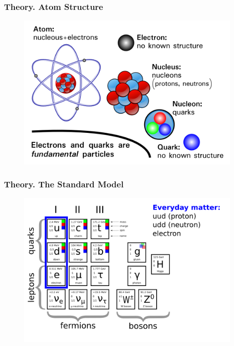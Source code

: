\begin{frame}\frametitle{Theory. Atom Structure}
\begin{figure}[htb]
  \begin{center}
    \includegraphics[width=0.98\textwidth]{../figs/ForPresentation/Theory_StandardModel01.png}
  \end{center}
\end{figure}
\end{frame}%

\begin{frame}\frametitle{Theory. The Standard Model}
\begin{figure}[htb]
  \begin{center}
    \includegraphics[width=0.98\textwidth]{../figs/ForPresentation/Theory_StandardModel02.png}
  \end{center}
\end{figure}
\end{frame}%

